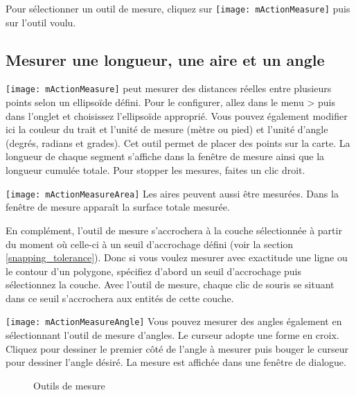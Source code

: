 Pour sélectionner un outil de mesure, cliquez sur \texttt{[image: mActionMeasure]} puis sur l'outil voulu.

\subsection{Mesurer une longueur, une aire et un angle}

\texttt{[image: mActionMeasure]} 
\qg peut mesurer des distances réelles entre plusieurs points selon un ellipsoïde 
défini. Pour le configurer, allez dans le menu  > 
 puis dans l'onglet  et choisissez 
l'ellipsoïde approprié. Vous pouvez également modifier ici la couleur du trait et 
l'unité de mesure (mètre ou pied) et l'unité d'angle (degrés, radians et grades). 
Cet outil permet de placer des points sur la 
carte. La longueur de chaque segment s'affiche dans la fenêtre de mesure ainsi 
que la longueur cumulée totale. Pour stopper les mesures, faites un clic droit. \par
\texttt{[image: mActionMeasureArea]} Les aires peuvent aussi être mesurées.
Dans la fenêtre de mesure apparaît la surface totale mesurée. \par
En complément, l'outil de mesure s'accrochera à la couche sélectionnée à partir 
du moment où celle-ci à un seuil d'accrochage défini (voir la section 
\ref{snapping_tolerance}). Donc si vous voulez mesurer avec exactitude une ligne 
ou le contour d'un polygone, spécifiez d'abord un seuil d'accrochage puis 
sélectionnez la couche. Avec l'outil de mesure, chaque clic de souris se situant 
dans ce seuil s'accrochera aux entités de cette couche. \par
\texttt{[image: mActionMeasureAngle]}
Vous pouvez mesurer des angles également en sélectionnant l'outil de mesure d'angles. Le 
curseur adopte une forme en croix. Cliquez pour dessiner le premier côté de 
l'angle à mesurer puis bouger le curseur pour dessiner l'angle désiré. La mesure 
est affichée dans une fenêtre de dialogue.

\begin{figure}[ht]
\centering
  \hspace{0.5cm}
  \hspace{0.5cm}
  \caption{Outils de mesure \nixcaption} \label{fig:measure}
\end{figure}

